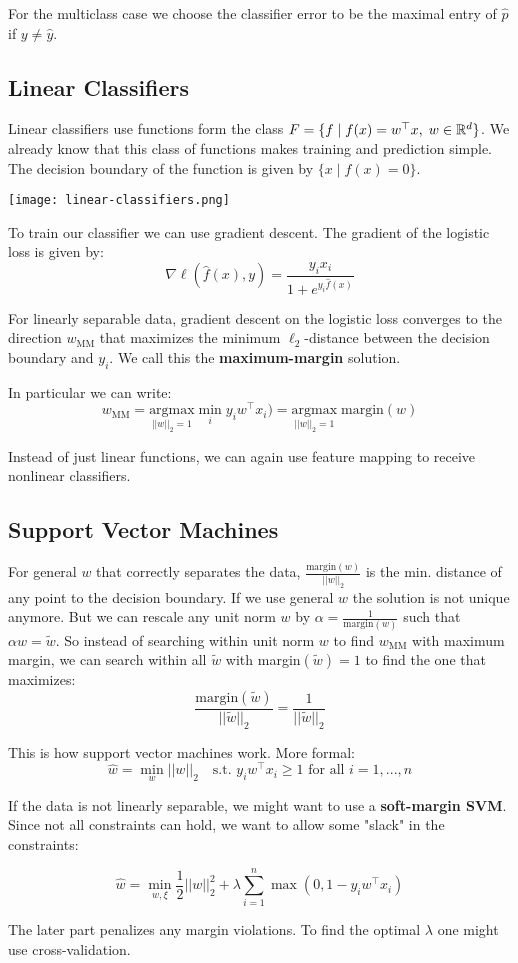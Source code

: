 For the multiclass case we choose the classifier error to be the maximal entry of $\hat{p}$ if $y \neq \hat{y}$.

\subsection{Linear Classifiers}

Linear classifiers use functions form the class $F = \{ f \; | \; f(x) = w^\top x, \; w \in \mathbb{R}^d\}$. We already know that this class of functions makes training and prediction simple. The decision boundary of the function is given by $\{ x \; | \; f(x) = 0\}$.

\begin{center}
	\texttt{[image: linear-classifiers.png]}
\end{center}

To train our classifier we can use gradient descent. The gradient of the logistic loss is given by:
$$\nabla \ell(\hat{f}(x), y) = \frac{y_i x_i}{1 + e^{y_i \hat{f}(x)}}$$
 
 For linearly separable data, gradient descent on the logistic loss converges to the direction $w_\text{MM}$ that maximizes the minimum $\ell_2$-distance between the decision boundary and $y_i$. We call this the \textbf{maximum-margin} solution.
 
 In particular we can write:
 $$w_\text{MM} = \underset{||w||_2 = 1}{\text{argmax}} \min_i y_i w^\top x_i ) = \underset{||w||_2 = 1}{\text{argmax}} \; \text{margin} (w)$$
 
 Instead of just linear functions, we can again use feature mapping to receive nonlinear classifiers.
 
 \subsection{Support Vector Machines}
 
 For general $w$ that correctly separates the data, $\frac{\text{margin}(w)}{||w||_2}$ is the min. distance of any point to the decision boundary. If we use general $w$ the solution is not unique anymore. But we can rescale any unit norm $w$ by $\alpha = \frac{1}{\text{margin}(w)}$ such that $\alpha w = \tilde{w}$. So instead of searching within unit norm $w$ to find $w_\text{MM}$ with maximum margin, we can search within all $\tilde{w}$ with margin$(\tilde{w}) = 1$ to find the one that maximizes:
 $$\frac{\text{margin}(\tilde{w})}{||\tilde{w}||_2} = \frac{1}{||\tilde{w}||_2}$$ 
 
 This is how support vector machines work. More formal:
 $$\hat{w} = \min_w ||w||_2 \quad \text{s.t. } y_i w^\top x_i \geq 1 \text{ for all } i=1,...,n$$
 
 If the data is not linearly separable, we might want to use a \textbf{soft-margin SVM}. Since not all constraints can hold, we want to allow some "slack" in the constraints:
 
  $$\hat{w} = \min_{w, \xi} \frac{1}{2} ||w||_2^2 + \lambda \sum_{i=1}^n \max (0, 1 - y_i w^\top x_i)$$
  
  The later part penalizes any margin violations. To find the optimal $\lambda$ one might use cross-validation.
  